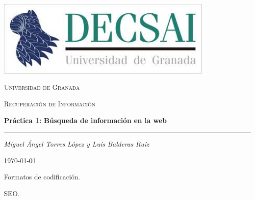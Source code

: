 \documentclass[12pt]{article}
\begin{document}
	\begin{titlepage}
		\centering
		\includegraphics[width=0.8\textwidth]{decsai.jpeg}\par\vspace{1cm}
		{\scshape\LARGE Universidad de Granada \par}
		\vspace{1cm}
		{\scshape\Large Recuperaci\'on de Informaci\'on \par}
		\vspace{1.5cm}
		{\huge\bfseries Pr\'actica 1: B\'usqueda de informaci\'on en la web\par}
		\vspace{0.2cm}
		\noindent\rule{\textwidth}{2pt}
		\vspace{2cm}
		{\Large\itshape Miguel \'Angel Torres L\'opez y Luis Balderas Ruiz\par}
		
		\vfill
		
		{\large \today\par}
	\end{titlepage}
	
	\tableofcontents
	
	\newpage


	\begin{section}{Formatos de codificaci\'on.}
		
	\end{section}

	\begin{section}{SEO.}
		
	\end{section}
\end{document}
